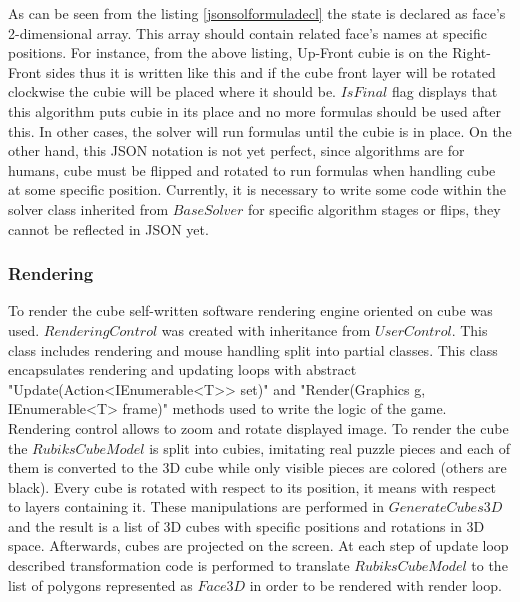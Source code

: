 \documentclass[../../main.tex]{subfiles}
\begin{document}
As can be seen from the listing \ref{jsonsolformuladecl} the state is declared as face's 2-dimensional array. This array should contain related face's names at specific positions. For instance, from the above listing, Up-Front cubie is on the Right-Front sides thus it is written like this and if the cube front layer will be rotated clockwise the cubie will be placed where it should be. $IsFinal$ flag displays that this algorithm puts cubie in its place and no more formulas should be used after this. In other cases, the solver will run formulas until the cubie is in place.
On the other hand, this \ac{JSON} notation is not yet perfect, since algorithms are for humans, cube must be flipped and rotated to run formulas when handling cube at some specific position. Currently, it is necessary to write some code within the solver class inherited from $BaseSolver$ for specific algorithm stages or flips, they cannot be reflected in \ac{JSON} yet.

\subsubsection*{Rendering}

To render the cube self-written software rendering engine oriented on cube was used. $RenderingControl$ was created with inheritance from $UserControl$. This class includes rendering and mouse handling split into partial classes. This class encapsulates rendering and updating loops with abstract "Update(Action<IEnumerable<T>> set)" and "Render(Graphics g, IEnumerable<T> frame)" methods used to write the logic of the game. Rendering control allows to zoom and rotate displayed image. To render the cube the $RubiksCubeModel$ is split into cubies, imitating real puzzle pieces and each of them is converted to the 3D cube while only visible pieces are colored (others are black). Every cube is rotated with respect to its position, it means with respect to layers containing it. These manipulations are performed in $GenerateCubes3D$ and the result is a list of 3D cubes with specific positions and rotations in 3D space. Afterwards, cubes are projected on the screen. At each step of update loop described transformation code is performed to translate $RubiksCubeModel$ to the list of polygons represented as $Face3D$ in order to be rendered with render loop.
\end{document}
